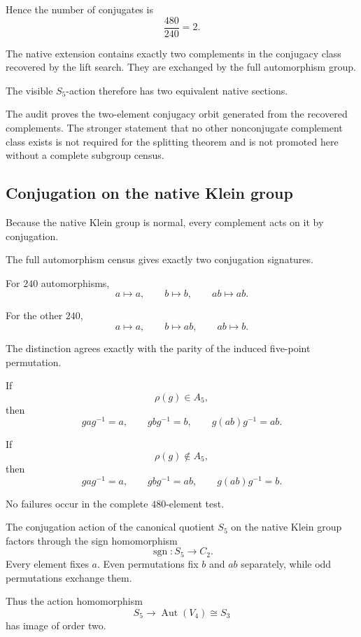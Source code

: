 Hence the number of conjugates is
\[
\frac{480}{240}=2.
\]

\begin{theorem}
The native extension contains exactly two complements in the
conjugacy class recovered by the lift search. They are exchanged by
the full automorphism group.
\end{theorem}

The visible \(S_5\)-action therefore has two equivalent native
sections.

The audit proves the two-element conjugacy orbit generated from the
recovered complements. The stronger statement that no other
nonconjugate complement class exists is not required for the splitting
theorem and is not promoted here without a complete subgroup census.

\subsection{Conjugation on the native Klein group}

Because the native Klein group is normal, every complement acts on it
by conjugation.

The full automorphism census gives exactly two conjugation signatures.

For \(240\) automorphisms,
\[
a\mapsto a,
\qquad
b\mapsto b,
\qquad
ab\mapsto ab.
\]

For the other \(240\),
\[
a\mapsto a,
\qquad
b\mapsto ab,
\qquad
ab\mapsto b.
\]

The distinction agrees exactly with the parity of the induced
five-point permutation.

If
\[
\rho(g)\in A_5,
\]
then
\[
gag^{-1}=a,
\qquad
gbg^{-1}=b,
\qquad
g(ab)g^{-1}=ab.
\]

If
\[
\rho(g)\notin A_5,
\]
then
\[
gag^{-1}=a,
\qquad
gbg^{-1}=ab,
\qquad
g(ab)g^{-1}=b.
\]

No failures occur in the complete \(480\)-element test.

\begin{theorem}
The conjugation action of the canonical quotient \(S_5\) on the native
Klein group factors through the sign homomorphism
\[
\operatorname{sgn}:S_5\longrightarrow C_2.
\]
Every element fixes \(a\). Even permutations fix \(b\) and \(ab\)
separately, while odd permutations exchange them.
\end{theorem}

Thus the action homomorphism
\[
S_5
\longrightarrow
\operatorname{Aut}(V_4)
\cong S_3
\]
has image of order two.

